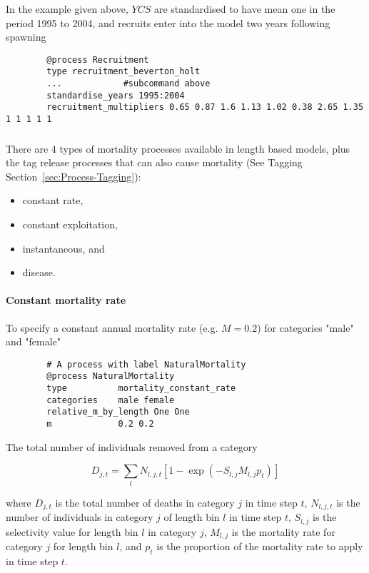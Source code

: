 In the  example given above, $YCS$ are standardised to have mean one in the period 1995 to 2004, and recruits enter into the model two years following spawning

{\small{\begin{verbatim}
		@process Recruitment
		type recruitment_beverton_holt
		...            #subcommand above
		standardise_years 1995:2004
		recruitment_multipliers 0.65 0.87 1.6 1.13 1.02 0.38 2.65 1.35 1 1 1 1 1
		\end{verbatim}}}

\subsubsection{\label{sec:Process-Mortality}}

There are 4 types of mortality processes available in \CNAME length based models, plus the tag release processes that can also cause mortality (See Tagging Section~\ref{sec:Process-Tagging}):

\begin{itemize}
	\item constant rate,
	\item constant exploitation,
	\item instantaneous, and
	\item disease.
\end{itemize}

\paragraph{Constant mortality rate}\label{sec:Process-MortalityConstantRate} 

To specify a constant annual mortality rate (e.g. $M=0.2$) for categories "male" and "female"
{\small{\begin{verbatim}
		# A process with label NaturalMortality
		@process NaturalMortality
		type          mortality_constant_rate
		categories    male female
		relative_m_by_length One One
		m             0.2 0.2
		\end{verbatim}}}

The total number of individuals removed from a category

\begin{equation}
D_{j,t} = \sum_l N_{l,j,t} [1 - \exp(-S_{l,j} M_{l,j} p_t)]
\end{equation}

where $D_{j,t}$ is the total number of deaths in category $j$ in time step $t$, $N_{l,j,t}$ is the number of individuals in category $j$ of length bin $l$ in time step $t$, $S_{l,j}$ is the selectivity value for length bin $l$ in category $j$, $M_{l,j}$ is the mortality rate for category $j$ for length bin $l$, and $p_t$ is the proportion of the mortality rate to apply in time step $t$.


